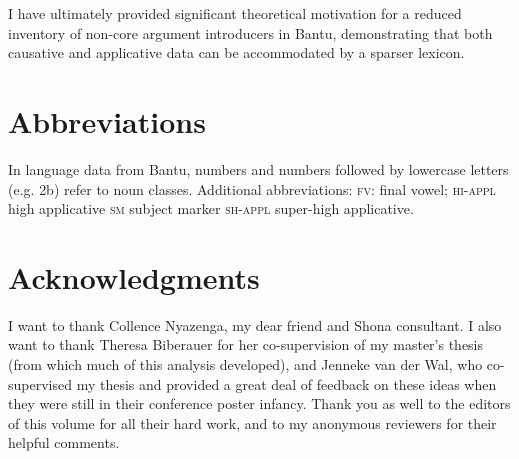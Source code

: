 \documentclass[output=paper,modfonts,nonflat,colorlinks,citecolor=brown]{langsci/langscibook}
\begin{document}
I have ultimately provided significant theoretical motivation for a reduced inventory of non-core argument introducers in Bantu, demonstrating that both causative and applicative data can be accommodated by a sparser lexicon.




\section*{Abbreviations}\label{sec:wechsler:abb}

{{In} {language} {data} {from} {Bantu,} {numbers} {and} {numbers} {followed} {by} {lowercase} {letters} {(e.g.} {2b)} {refer} {to} {noun} {classes.}} Additional abbreviations:
\textsc{fv}: final vowel;
\textsc{hi-appl} high applicative
\textsc{sm} subject marker
\textsc{sh-appl} super-high applicative.



\section*{Acknowledgments}\label{sec:wechsler:ack}

I want to thank Collence Nyazenga, my dear friend and Shona consultant. I also want to thank Theresa Biberauer for her co-supervision of my master’s thesis (from which much of this analysis developed), and Jenneke van der Wal, who co-supervised my thesis and provided a great deal of feedback on these ideas when they were still in their conference poster infancy. Thank you as well to the editors of this volume for all their hard work, and to my anonymous reviewers for their helpful comments.

\sloppy\printbibliography[heading=subbibliography,notkeyword=this]
\end{document}
